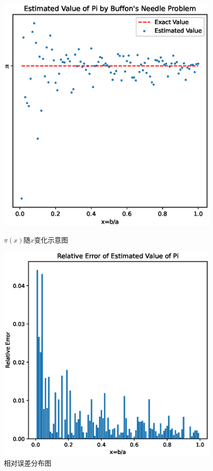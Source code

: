\documentclass[12pt,a4paper]{article}%
\begin{document}
\begin{figure}[H]%
    \centering
    \begin{minipage}{0.48\textwidth}
        \centering
        \includegraphics[width=1.1\textwidth]{Pi_value.eps}
        \caption{\fontsize{10pt}{15pt}\selectfont $\pi(x)$随$x$变化示意图}
    \end{minipage}
    \hspace{0cm}%
    \hfill%
    \begin{minipage}{0.48\textwidth}
        \centering
        \includegraphics[width=1.1\textwidth]{Relative Error.eps}
        \caption{\fontsize{10pt}{15pt}\selectfont 相对误差分布图}
    \end{minipage}\label{fig:figure2}
\end{figure}
\end{document}
